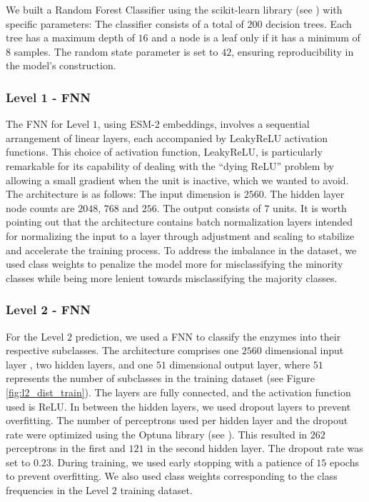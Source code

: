 \documentclass{bioinfo}
\begin{document}
\begin{methods}
We built a Random Forest Classifier using the scikit-learn library (see \cite{scikit-learn}) with specific parameters: 
The classifier consists of a total of $200$ decision trees. Each tree has a
maximum depth of $16$ and a node is a leaf only if it has a
minimum of $8$ samples. The random state parameter is set to $42$, ensuring
reproducibility in the model's construction.

\subsubsection{Level 1 - FNN}\label{sec:level1_methods}
The FNN for Level $1$, using ESM-2 embeddings, involves a sequential arrangement of linear layers, each accompanied 
by LeakyReLU activation functions. This choice of activation function, LeakyReLU, is particularly remarkable for its 
capability of dealing with the “dying ReLU” problem by allowing a small gradient when the unit is inactive, which we wanted 
to avoid. The architecture is as follows: The input dimension is $2560$. The hidden layer node counts are $2048$, $768$ and $256$. 
The output consists of $7$ units. It is worth pointing out that the architecture contains batch normalization layers intended for 
normalizing the input to a layer through adjustment and scaling to stabilize and accelerate the training process. 
To address the imbalance in the dataset, we used class weights to penalize the model more for misclassifying the minority classes 
while being more lenient towards misclassifying the majority classes.

\subsubsection{Level 2 - FNN}\label{sec:level2_methods}
For the Level $2$ prediction, we used a FNN to classify the enzymes into their respective subclasses.
The architecture comprises one $2560$ dimensional input layer , two hidden layers, and one $51$ dimensional output layer,
where $51$ represents the number of subclasses in the training dataset (see Figure \ref{fig:l2_dist_train}).
The layers are fully connected, and the activation function used is ReLU.
In between the hidden layers, we used dropout layers to prevent overfitting.
The number of perceptrons used per hidden layer and the dropout rate were optimized using the Optuna library (see \cite{optuna_2019}).
This resulted in $262$ perceptrons in the first and $121$ in the second hidden layer.
The dropout rate was set to $0.23$.
During training, we used early stopping with a patience of $15$ epochs to prevent overfitting.
We also used class weights corresponding to the class frequencies in the Level $2$ training dataset.




\end{methods}
\end{document}
